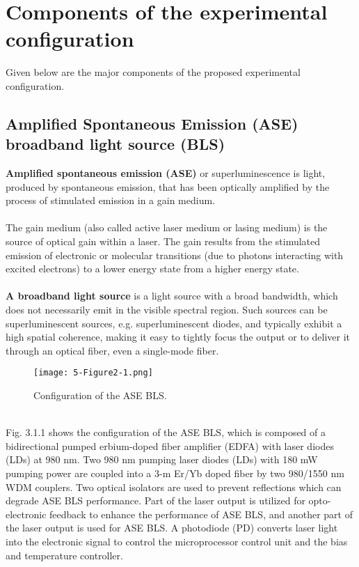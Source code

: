 \documentclass[hidelinks, 12pt]{report}
\begin{document}
\section{Components of the experimental configuration}
\justify
Given below are the major components of the proposed experimental configuration.
\subsection{Amplified Spontaneous Emission (ASE) broadband light source (BLS)}
\justify
\textbf{Amplified spontaneous emission (ASE)} or superluminescence is light, produced by spontaneous emission, that has been optically amplified by the process of stimulated emission in a gain medium.\\
\\The gain medium (also called active laser medium or lasing medium) is the source of optical gain within a laser. The gain results from the stimulated emission of electronic or molecular transitions  (due to photons interacting with excited electrons) to a lower energy state from a higher energy state.\\
\\\textbf{A broadband light source} is a light source with a broad bandwidth, which does not necessarily emit in the visible spectral region. Such sources can be superluminescent sources, e.g. superluminescent diodes, and typically exhibit a high spatial coherence, making it easy to tightly focus the output or to deliver it through an optical fiber, even a single-mode fiber. 


\begin{figure}[H]
\centering
\texttt{[image: 5-Figure2-1.png]}
\caption[Configuration of the ASE BLS.]{Configuration of the ASE BLS.}
\label{Configuration of the ASE BLS.}
\end{figure}
\\
Fig. 3.1.1 shows the configuration of the ASE BLS, which is composed of a
bidirectional pumped erbium-doped
fiber amplifier (EDFA) with laser diodes (LDs) at 980 nm. Two 980 nm pumping laser diodes (LDs) with 180 mW pumping
power are coupled into a 3-m Er/Yb doped fiber by two 980/1550 nm WDM couplers. Two optical
isolators are used to prevent reflections which can degrade ASE BLS performance. Part of the
laser output is utilized for opto-electronic feedback to enhance the performance of ASE BLS, and
another part of the laser output is used for ASE BLS. A photodiode (PD) converts laser light into the electronic signal to control the microprocessor control unit and the bias and temperature controller.\\
\end{document}
